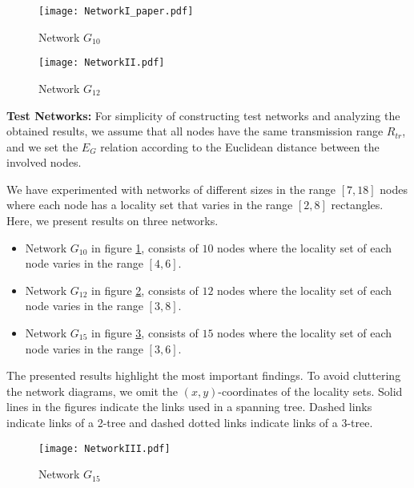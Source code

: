 \begin{figure}[!htb]
\begin{minipage}{.9\linewidth}
\texttt{[image: NetworkI\_paper.pdf]}
\caption{Network $G_{10}$}
\label{fig:netI}
\end{minipage}

\end{figure}
\begin{figure}[!htb]
\begin{minipage}{.9\linewidth}
\texttt{[image: NetworkII.pdf]}
\caption{Network $G_{12}$}
\label{fig:netII}
\end{minipage}
\end{figure}
\textbf{Test Networks:}
    For simplicity of constructing test networks and analyzing the obtained results, we assume that all nodes have the same transmission range $R_{tr}$, and we set the $E_G$ relation according to the Euclidean distance between the involved nodes.

We have experimented with networks of different sizes in the range $[7,18]$ nodes where each node has a locality set that varies in the range $[2,8]$ rectangles. Here, we  present results on three networks.
\begin{itemize}[noitemsep]
\item Network $G_{10}$ in figure \ref{fig:netI}, consists of $10$ nodes where the locality set of each node varies in the range $[4,6]$.
\item Network $G_{12}$ in figure \ref{fig:netII}, consists of $12$ nodes where the locality set of each node varies in the range $[3,8]$.
\item Network $G_{15}$ in figure \ref{fig:netIII}, consists of $15$ nodes where the locality set of each node varies in the range $[3,6]$.
\end{itemize}
The presented results highlight the most important findings. To avoid cluttering the network diagrams, we omit the $(x, y)$-coordinates of the locality sets. Solid lines in the figures indicate the links used in a spanning tree. Dashed links indicate links of  a 2-tree and dashed dotted links indicate links of a 3-tree.

\begin{figure}[!htb]
\begin{minipage}{.9\linewidth}
\texttt{[image: NetworkIII.pdf]}
\caption{Network $G_{15}$}
\label{fig:netIII}
\end{minipage}
\end{figure}
   

